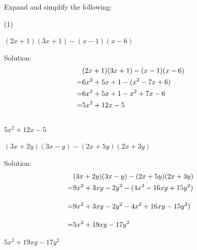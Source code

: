 \noindent%
Expand and simplify the following:
\begin{mtask}[start=1](1) 
   \task \begin{exercise} $(2x+1)(3x+1)-(x-1)(x-6)$
              \begin{envSolution}
			      Solution:
			      \begin{align*}
			         &(2x+1)(3x+1)-(x-1)(x-6)                      \\
					=&6x^2+5x+1-(x^2-7x+6)                         \\            
                    =&6x^2+5x+1-x^2+7x-6                           \\	  
					\linebreak[15pt]			     
                    =&5x^2+12x-5 \\[10pt]                                  
				 \end{align*}
                 \begin{shortsolution}  
				       $5x^2+12x-5$
                 \end{shortsolution}
               \end{envSolution}
         \end{exercise}

   \task \begin{exercise} $(3x+2y)(3x-y)-(2x+5y)(2x+3y)$
              \begin{envSolution}
			      Solution:
			      \begin{align*}
			         &(3x+2y)(3x-y)-(2x+5y)(2x+3y)                      \\
					=&9x^2+3xy-2y^2-(4x^2-16xy+15y^2)                   \\[10pt]            
                    =&9x^2+3xy-2y^2-4x^2+16xy-15y^2)                    \\[10pt]	  
					\linebreak[15pt]			     
                    =&5x^2+19xy-17y^2                                 
				 \end{align*}
                 \begin{shortsolution}  
				       $5x^2+19xy-17y^2$
                 \end{shortsolution}
               \end{envSolution}
         \end{exercise}
		 

\end{mtask}
